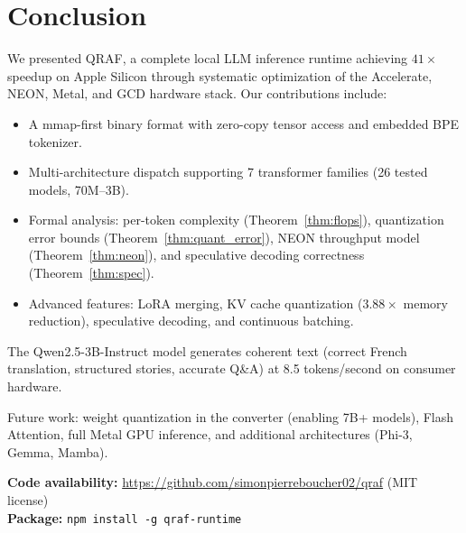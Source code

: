 \documentclass[12pt,a4paper]{article}
\begin{document}
\section{Conclusion}
\label{sec:conclusion}

We presented QRAF, a complete local LLM inference runtime achieving $41\times$ speedup on Apple Silicon through systematic optimization of the Accelerate, NEON, Metal, and GCD hardware stack. Our contributions include:

\begin{itemize}[nosep]
    \item A mmap-first binary format with zero-copy tensor access and embedded BPE tokenizer.
    \item Multi-architecture dispatch supporting 7 transformer families (26 tested models, 70M--3B).
    \item Formal analysis: per-token complexity (Theorem~\ref{thm:flops}), quantization error bounds (Theorem~\ref{thm:quant_error}), NEON throughput model (Theorem~\ref{thm:neon}), and speculative decoding correctness (Theorem~\ref{thm:spec}).
    \item Advanced features: LoRA merging, KV cache quantization ($3.88\times$ memory reduction), speculative decoding, and continuous batching.
\end{itemize}

The Qwen2.5-3B-Instruct model generates coherent text (correct French translation, structured stories, accurate Q\&A) at 8.5 tokens/second on consumer hardware.

Future work: weight quantization in the converter (enabling 7B+ models), Flash Attention, full Metal GPU inference, and additional architectures (Phi-3, Gemma, Mamba).

\vspace{1em}
\noindent\textbf{Code availability:} \url{https://github.com/simonpierreboucher02/qraf} (MIT license)\\
\textbf{Package:} \texttt{npm install -g qraf-runtime}
\end{document}
